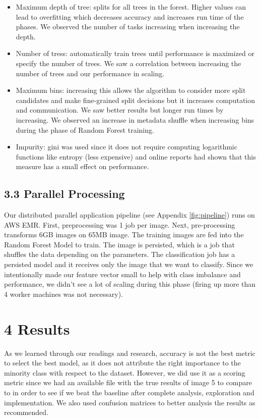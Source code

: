 \documentclass{neu_handout}
\begin{document}
\begin{itemize}
\setlength\itemsep{0.2em}
\item Maximum depth of tree: splits for all trees in the forest. Higher values can lead to overfitting which decreases accuracy and increases run time of the phases. We observed the number of tasks increasing when increasing the depth.
\item Number of tress: automatically train trees until performance is maximized or specify the number of trees. We saw a correlation between increasing the number of trees and our performance in scaling.
\item Maximum bins: increasing this allows the algorithm to consider more split candidates and make fine-grained split decisions but it increases computation and communication. We saw better results but longer run times by increasing. We observed an increase in metadata shuffle when increasing bins during the phase of Random Forest training.
\item Impurity: gini was used since it does not require computing logarithmic functions like entropy (less expensive) and online reports had shown that this measure has a small effect on performance.
\end{itemize}

\subsection*{3.3 Parallel Processing}
Our distributed parallel application pipeline (see Appendix \ref{fig:pipeline}) runs on AWS EMR. First, preprocessing was 1 job per image. Next, pre-processing transforms 6GB images on 65MB image. The training images are fed into the Random Forest Model to train. The image is persisted, which is a job that shuffles the data depending on the parameters. The classification job has a persisted model and it receives only the image that we want to classify. Since we intentionally made our feature vector small to help with class imbalance and performance, we didn’t see a lot of scaling during this phase (firing up more than 4 worker machines was not necessary).

\section*{4 Results}

As we learned through our readings and research, accuracy is not the best metric to select the best model, as it does not attribute the right importance to the minority class with respect to the dataset. However, we did use it as a scoring metric since we had an available file with the true results of image 5 to compare to in order to see if we beat the baseline after complete analysis, exploration and implementation. We also used confusion matrices to better analysis the results as recommended\cite{imbalance}.
\end{document}
